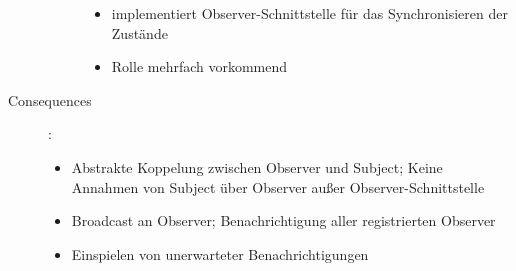 \begin{description}
\begin{description}
\begin{itemize}
            \item implementiert Observer-Schnittstelle für das Synchronisieren der Zustände
            \item Rolle mehrfach vorkommend     
        \end{itemize}
    \end{description}
    \item[Consequences]:
    \begin{itemize}
        \item Abstrakte Koppelung zwischen Observer und Subject; Keine Annahmen von Subject über Observer außer Observer-Schnittstelle
        \item Broadcast an Observer; Benachrichtigung aller registrierten Observer
        \item Einspielen von unerwarteter Benachrichtigungen 
    \end{itemize}
\end{description}